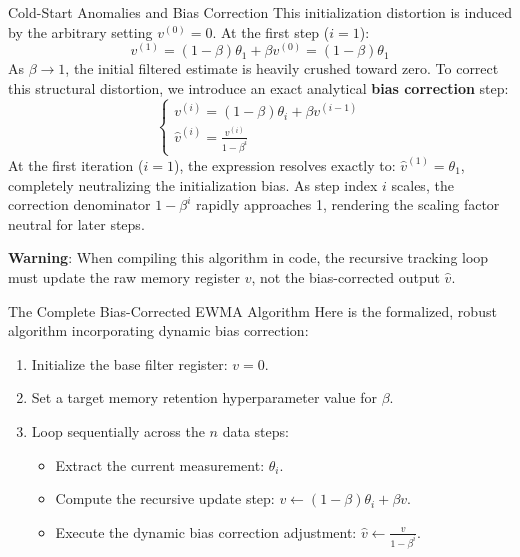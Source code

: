 \begin{frame}{Cold-Start Anomalies and Bias Correction}
	This initialization distortion is induced by the arbitrary setting $v^{(0)} = 0$. At the first step ($i = 1$):
	\begin{equation*}
		v^{(1)} = (1 - \beta) \theta_1 + \beta v^{(0)} = (1 - \beta) \theta_1
	\end{equation*}
	As $\beta \to 1$, the initial filtered estimate is heavily crushed toward zero. To correct this structural distortion, we introduce an exact analytical \textbf{bias correction} step:
	\pause
	\begin{equation*}
		\begin{cases}
			v^{(i)} = (1 - \beta) \theta_i + \beta v^{(i-1)} \\
			\hat{v}^{(i)} = \displaystyle \frac{v^{(i)}}{1 - \beta^i}
		\end{cases}
	\end{equation*}
	\pause
	At the first iteration ($i = 1$), the expression resolves exactly to: $\hat{v}^{(1)} = \theta_1$, completely neutralizing the initialization bias. As step index $i$ scales, the correction denominator $1 - \beta^i$ rapidly approaches 1, rendering the scaling factor neutral for later steps.
	
	\vspace{0.2cm}
	\textbf{Warning}: When compiling this algorithm in code, the recursive tracking loop must update the raw memory register $v$, not the bias-corrected output $\hat{v}$.
\end{frame}

\begin{frame}{The Complete Bias-Corrected EWMA Algorithm}
	Here is the formalized, robust algorithm incorporating dynamic bias correction:
	\begin{enumerate}
		\item Initialize the base filter register: $v = 0$.
		\item Set a target memory retention hyperparameter value for $\beta$.
		\item Loop sequentially across the $n$ data steps:
		\begin{itemize}
			\item Extract the current measurement: $\theta_i$.
			\item Compute the recursive update step: $v \leftarrow (1 - \beta) \theta_i + \beta v$.
			\item Execute the dynamic bias correction adjustment: $\hat{v} \leftarrow \frac{v}{1 - \beta^i}$.
		\end{itemize}
	\end{enumerate}
\end{frame}

